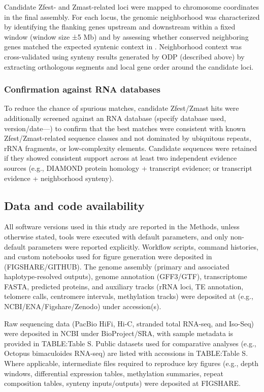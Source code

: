 \documentclass[11pt]{article}
\begin{document}
Candidate Zfest- and Zmast-related loci were mapped to chromosome coordinates in the final assembly. For each locus, the genomic neighborhood was characterized by identifying the flanking genes upstream and downstream within a fixed window (window size ±5 Mb) and by assessing whether conserved neighboring genes matched the expected syntenic context in \cite{Papanicolaou2024.12.09.627507}. Neighborhood context was cross-validated using synteny results generated by ODP (described above) by extracting orthologous segments and local gene order around the candidate loci.

\subsubsection{Confirmation against RNA databases}

To reduce the chance of spurious matches, candidate Zfest/Zmast hits were additionally screened against an RNA database (specify database used, version/date—) to confirm that the best matches were consistent with known Zfest/Zmast-related sequence classes and not dominated by ubiquitous repeats, rRNA fragments, or low-complexity elements. Candidate sequences were retained if they showed consistent support across at least two independent evidence sources (e.g., DIAMOND protein homology + transcript evidence; or transcript evidence + neighborhood synteny).

\subsection{Data and code availability}

All software versions used in this study are reported in the Methods, unless otherwise stated, tools were executed with default parameters, and only non-default parameters were reported explicitly. Workflow scripts, command histories, and custom notebooks used for figure generation were deposited in (FIGSHARE/GITHUB). The genome assembly (primary and associated haplotype-resolved outputs), genome annotation (GFF3/GTF), transcriptome FASTA, predicted proteins, and auxiliary tracks (rRNA loci, TE annotation, telomere calls, centromere intervals, methylation tracks) were deposited at (e.g., NCBI/ENA/Figshare/Zenodo) under accession(s).

Raw sequencing data (PacBio HiFi, Hi-C, stranded total RNA-seq, and Iso-Seq) were deposited in NCBI under BioProject/SRA, with sample metadata is provided in TABLE:Table S. Public datasets used for comparative analyses (e.g., Octopus bimaculoides RNA-seq) are listed with accessions in TABLE:Table S. Where applicable, intermediate files required to reproduce key figures (e.g., depth windows, differential expression tables, methylation summaries, repeat composition tables, synteny inputs/outputs) were deposited at FIGSHARE.
\end{document}
